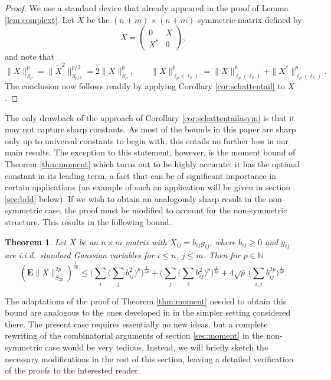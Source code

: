 \documentclass[10pt,reqno]{amsart}
\newtheorem{thm}{Theorem}[section]
\theoremstyle{definition}
\numberwithin{equation}{section}
\numberwithin{figure}{section}
\numberwithin{table}{section}
\begin{document}
\begin{proof}
We use a standard device that already appeared in the proof of Lemma 
\ref{lem:complext}. Let $\tilde X$ be the $(n+m)\times(n+m)$ symmetric 
matrix defined by
$$
	\tilde X =
	\begin{pmatrix}
	0 & X \\
	X^* & 0
	\end{pmatrix},
$$
and note that
$$
	\|\tilde X\|_{S_{p}}^{p} =
	\|\tilde X^2\|_{S_{p/2}}^{p/2} = 2\|X\|_{S_{p}}^{p},\qquad
	\|\tilde X\|_{\ell_p(\ell_2)}^p =
	\|X\|_{\ell_p(\ell_2)}^p +
	\|X^*\|_{\ell_p(\ell_2)}^p.	
$$
The conclusion now follows readily by applying Corollary 
\ref{cor:schattentail} to $\tilde X$.
\end{proof}

The only drawback of the approach of Corollary \ref{cor:schattentailasym} 
is that it may not capture sharp constants. As most of the bounds in this 
paper are sharp only up to universal constants to begin with, this entails 
no further loss in our main results. The exception to this statement, 
however, is the moment bound of Theorem \ref{thm:moment} which turns out 
to be highly accurate: it has the optimal constant in its leading term, a 
fact that can be of significant importance in certain applications (an 
example of such an application will be given in section \ref{sec:bdd} 
below). If we wish to obtain an analogously sharp result in the 
non-symmetric case, the proof must be modified to account for the 
non-symmetric structure. This results in the following bound.

\begin{thm}
\label{thm:momentrect}
Let $X$ be an $n\times m$ matrix with 
$X_{ij}=b_{ij}g_{ij}$, where $b_{ij}\ge 0$ and $g_{ij}$ are i.i.d.\ 
standard Gaussian variables for $i\le n$, $j\le m$. Then for $p\in\mathbb{N}$
$$
	(\mathbf{E}\|X\|_{S_{2p}}^{2p})^{\frac{1}{2p}} \le
	\Bigg(\sum_i\Bigg(\sum_j b_{ij}^2\Bigg)^p\Bigg)^{\frac{1}{2p}} + 
	\Bigg(\sum_j\Bigg(\sum_i b_{ij}^2\Bigg)^p\Bigg)^{\frac{1}{2p}}
	+ 4\sqrt{p}\,\Bigg(\sum_{i,j} b_{ij}^{2p}\Bigg)^{\frac{1}{2p}}.
$$
\end{thm}

The adaptations of the proof of Theorem \ref{thm:moment} needed to obtain 
this bound are analogous to the ones developed in \cite[section 
3.1]{BvH16} in the simpler setting considered there. The present case 
requires essentially no new ideas, but a complete rewriting of the 
combinatorial arguments of section \ref{sec:moment} in the non-symmetric 
case would be very tedious. Instead, we will briefly sketch the necessary 
modifications in the rest of this section, leaving a detailed 
verification of the proofs to the interested reader.
\end{document}
